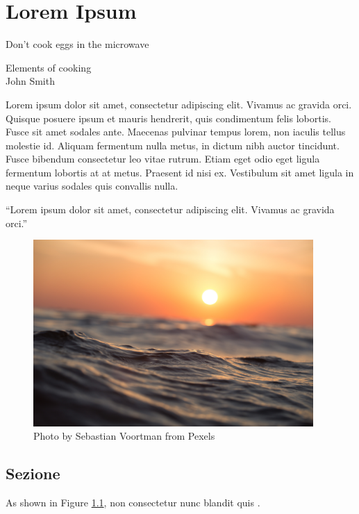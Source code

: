 \chapter{Lorem Ipsum}

\epigraph{Don't cook eggs in the microwave}{Elements of cooking\\John Smith}

Lorem ipsum dolor sit amet, consectetur adipiscing elit. Vivamus ac gravida orci. Quisque posuere ipsum et mauris hendrerit, quis condimentum felis lobortis. Fusce sit amet sodales ante. Maecenas pulvinar tempus lorem, non iaculis tellus molestie id. Aliquam fermentum nulla metus, in dictum nibh auctor tincidunt. Fusce bibendum consectetur leo vitae rutrum. Etiam eget odio eget ligula fermentum lobortis at at metus. Praesent id nisi ex. Vestibulum sit amet ligula in neque varius sodales quis convallis nulla.

\begin{definition}
	\label{def:my_definition}
	``Lorem ipsum dolor sit amet, consectetur adipiscing elit. Vivamus ac gravida orci.''
\end{definition}

\begin{figure}[tb]		%
	\begin{center}
		\includegraphics[width=0.95\textwidth]{./img/raster/sea}
		\caption{Photo by Sebastian Voortman from Pexels}
		\label{fig:sea}
	\end{center}
\end{figure}

\section{Sezione}
As shown in Figure \ref{fig:sea}, non consectetur nunc blandit quis \cite{millman}.

